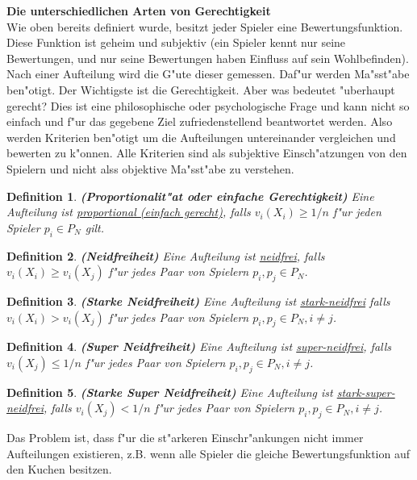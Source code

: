 \documentclass[11pt, a4paper, twoside]{article}
\newtheorem*{defi}{Definition}
\numberwithin{equation}{section}
\begin{document}
\newline
\textbf{Die unterschiedlichen Arten von Gerechtigkeit}\\
\newline
Wie oben bereits definiert wurde, besitzt jeder Spieler eine Bewertungsfunktion. Diese Funktion ist geheim und subjektiv (ein Spieler kennt nur seine Bewertungen, und nur seine Bewertungen haben Einfluss auf sein Wohlbefinden). Nach einer Aufteilung wird die G"ute dieser gemessen. Daf"ur werden Ma"sst"abe ben"otigt. Der Wichtigste ist die Gerechtigkeit. Aber was bedeutet "uberhaupt gerecht? Dies ist eine philosophische oder psychologische Frage und kann nicht so einfach und f"ur das gegebene Ziel zufriedenstellend beantwortet werden. Also werden Kriterien ben"otigt um die Aufteilungen untereinander vergleichen und bewerten zu k"onnen. Alle Kriterien sind als subjektive Einsch"atzungen von den Spielern und nicht alss objektive Ma"sst"abe zu verstehen. 
\begin{defi}{\textbf{(Proportionalit"at oder einfache Gerechtigkeit)}}
\newline Eine Aufteilung ist \underline{proportional (einfach gerecht)}, falls  $v_i(X_i) \geq 1/n$ f"ur jeden Spieler $p_i \in P_N$ gilt. 
\end{defi} 
\begin{defi}{\textbf{(Neidfreiheit)}}
\newline Eine Aufteilung ist \underline{neidfrei}, falls $v_i(X_i) \geq v_i(X_j)$ f"ur jedes Paar von Spielern $p_i, p_j \in P_N$. 
\end{defi}
\begin{defi}{\textbf{(Starke Neidfreiheit)}}
\newline  Eine Aufteilung ist \underline{stark-neidfrei} falls $v_i(X_i) > v_i(X_j)$ f"ur jedes Paar von Spielern $p_i, p_j \in P_N, i \neq j$.  
\end{defi} 
\begin{defi}{\textbf{(Super Neidfreiheit)}}
\newline Eine Aufteilung ist \underline{super-neidfrei}, falls $v_i(X_j) \leq 1/n$  f"ur jedes Paar von Spielern $p_i, p_j \in P_N, i \neq j$. 
\end{defi} 
\begin{defi}{\textbf{(Starke Super Neidfreiheit)}}
\newline Eine Aufteilung ist \underline{stark-super-neidfrei}, falls $v_i(X_j) < 1/n$  f"ur jedes Paar von Spielern $p_i, p_j \in P_N, i \neq j$. 
\end{defi} 
Das Problem ist, dass f"ur die st"arkeren Einschr"ankungen nicht immer Aufteilungen existieren, z.B. wenn alle Spieler die gleiche Bewertungsfunktion auf den Kuchen besitzen. 
\end{document}
